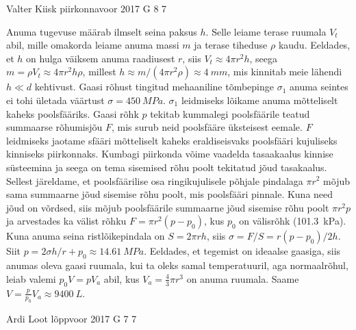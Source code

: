 \documentclass[11pt, twoside]{article}
\begin{document}
{%
{Valter Kiisk} %
{piirkonnavoor} %
{2017} %
{G 8} %
{7} %
{

\ifSolution
Anuma tugevuse määrab ilmselt seina paksus $h$. Selle leiame terase ruumala $V_t$ abil, mille omakorda leiame anuma massi $m$ ja terase tiheduse $\rho$ kaudu. Eeldades, et $h$ on hulga väiksem anuma raadiusest $r$, siis $V_t\approx4\pi r^2 h$, seega $m=\rho V_t \approx 4\pi r^2h\rho$, millest $h\approx m/(4\pi r^2\rho)\approx \SI{4}{mm}$, mis kinnitab meie lähendi $h\ll d$ kehtivust. Gaasi rõhust tingitud mehaaniline tõmbepinge $\sigma_1$ anuma seintes ei tohi ületada väärtust $\sigma=\SI{450}{MPa}$. $\sigma_1$ leidmiseks lõikame anuma mõtteliselt kaheks poolsfääriks.
Gaasi rõhk $p$ tekitab kummalegi poolsfäärile teatud summaarse rõhumisjõu $F$, mis surub neid poolsfääre üksteisest eemale. $F$ leidmiseks jaotame sfääri mõtteliselt kaheks eraldiseisvaks poolsfääri kujuliseks kinniseks piirkonnaks. Kumbagi piirkonda võime vaadelda tasaakaalus kinnise süsteemina ja seega on tema sisemised rõhu poolt tekitatud jõud tasakaalus. Sellest järeldame, et poolsfäärilise osa ringikujulisele põhjale pindalaga $\pi r^2$ mõjub sama summaarne jõud sisemise rõhu poolt, mis poolsfääri pinnale. Kuna need jõud on võrdsed, siis mõjub poolsfäärile summaarne jõud sisemise rõhu poolt $\pi r^2 p$ ja arvestades ka välist rõhku $F=\pi r^2(p-p_0)$, kus $p_0$ on välisrõhk (\SI{101.3}{kPa}). Kuna anuma seina ristlõikepindala on $S=2\pi rh$, siis $\sigma=F/S=r(p-p_0)/2h$. Siit $p=2\sigma h/r+p_0\approx \SI{14.61}{MPa}$. Eeldades, et tegemist on ideaalse gaasiga, siis anumas oleva gaasi ruumala, kui ta oleks samal temperatuuril, aga normaalrõhul, leiab valemi $p_0V=pV_a$ abil, kus $V_a=\frac{4}{3}\pi r^3$ on anuma ruumala. Saame $V=\frac{p}{p_0}V_a\approx\SI{9400}{L}$.
\fi
}

{Ardi Loot} %
{lõppvoor} %
{2017} %
{G 7} %
{7} %
{

}}
\end{document}
